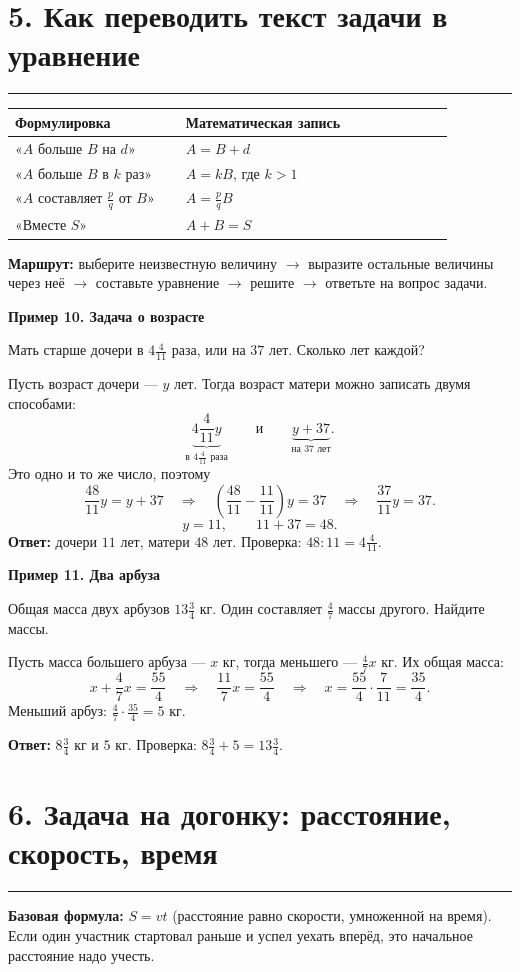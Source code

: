 \documentclass[a4paper,12pt]{article}
\newcommand{\sect}[1]{\section*{#1}\vspace{-3pt}\noindent\textcolor{accent}{\rule{\linewidth}{0.5pt}}\vspace{3pt}}
\newcommand{\key}[1]{\textcolor{darkaccent}{\textbf{#1}}}
\newcommand{\ex}[1]{\medskip\noindent\textcolor{darkaccent}{\textbf{#1}}\par\vspace{-2mm}}
\begin{document}
\sect{5. Как переводить текст задачи в уравнение}
\begin{center}
\begin{tabular}{@{}p{0.35\linewidth}p{0.55\linewidth}@{}}
\toprule
\textbf{Формулировка} & \textbf{Математическая запись} \\
\midrule
«$A$ больше $B$ на $d$» & $A=B+d$ \\
«$A$ больше $B$ в $k$ раз» & $A=kB$, где $k>1$ \\
«$A$ составляет $\frac pq$ от $B$» & $A=\frac pq B$ \\
«Вместе $S$» & $A+B=S$ \\
\bottomrule
\end{tabular}
\end{center}
\key{Маршрут:} выберите неизвестную величину $\rightarrow$ выразите остальные величины через неё $\rightarrow$ составьте уравнение $\rightarrow$ решите $\rightarrow$ ответьте на вопрос задачи.

\ex{Пример 10. Задача о возрасте}
Мать старше дочери в $4\frac4{11}$ раза, или на $37$ лет. Сколько лет каждой?

Пусть возраст дочери --- $y$ лет. Тогда возраст матери можно записать двумя способами:
\[
\underbrace{4\frac4{11}y}_{\text{в $4\frac4{11}$ раза}}
\qquad\text{и}\qquad
\underbrace{y+37}_{\text{на $37$ лет}}.
\]
Это одно и то же число, поэтому
\[
\frac{48}{11}y=y+37
\quad\Longrightarrow\quad
\left(\frac{48}{11}-\frac{11}{11}\right)y=37
\quad\Longrightarrow\quad
\frac{37}{11}y=37.
\]
\[
y=11,\qquad 11+37=48.
\]
\textcolor{darkaccent}{\textbf{Ответ:}} дочери $11$ лет, матери $48$ лет. Проверка: $48:11=4\frac4{11}$.

\ex{Пример 11. Два арбуза}
Общая масса двух арбузов $13\frac34$ кг. Один составляет $\frac47$ массы другого. Найдите массы.

Пусть масса большего арбуза --- $x$ кг, тогда меньшего --- $\frac47x$ кг. Их общая масса:
\[
x+\frac47x=\frac{55}{4}
\quad\Longrightarrow\quad
\frac{11}{7}x=\frac{55}{4}
\quad\Longrightarrow\quad
x=\frac{55}{4}\cdot\frac7{11}=\frac{35}{4}.
\]
Меньший арбуз: $\frac47\cdot\frac{35}{4}=5$ кг.

\textcolor{darkaccent}{\textbf{Ответ:}} $8\frac34$ кг и $5$ кг. Проверка: $8\frac34+5=13\frac34$.

\clearpage
\sect{6. Задача на догонку: расстояние, скорость, время}
\key{Базовая формула:} $S=vt$ (расстояние равно скорости, умноженной на время). Если один участник стартовал раньше и успел уехать вперёд, это начальное расстояние надо учесть.
\end{document}
